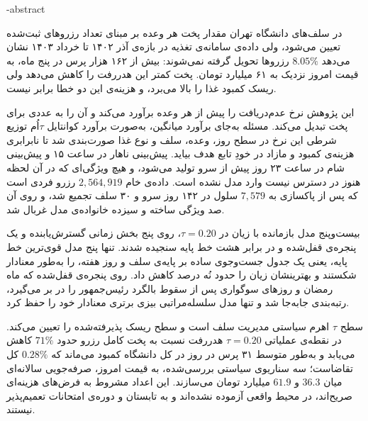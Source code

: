 \fa-abstract{
در سلف‌های دانشگاه تهران مقدار پخت هر وعده بر مبنای تعداد رزروهای ثبت‌شده تعیین می‌شود،
ولی داده‌ی سامانه‌ی تغذیه در بازه‌ی آذر ۱۴۰۲ تا خرداد ۱۴۰۳ نشان می‌دهد $8.05\%$ رزروها
تحویل گرفته نمی‌شوند: بیش از ۱۶۲ هزار پرس در پنج ماه، به قیمت امروز نزدیک به ۶۱ میلیارد
تومان. پخت
کمتر این هدررفت را کاهش می‌دهد ولی ریسک کمبود غذا را بالا می‌برد، و هزینه‌ی این دو خطا
برابر نیست.

این پژوهش نرخ عدم‌دریافت را پیش از هر وعده برآورد می‌کند و آن را به عددی برای پخت تبدیل
می‌کند. مسئله به‌جای برآورد میانگین، به‌صورت برآورد کوانتایل $\tau$اُم توزیع شرطی این نرخ
در سطح روز، وعده، سلف و نوع غذا صورت‌بندی شد تا نابرابری هزینه‌ی کمبود و مازاد در خودِ
تابع هدف بیاید. پیش‌بینی ناهار در ساعت ۱۵ و پیش‌بینی شام در ساعت ۲۳ روز پیش از سرو
تولید می‌شود، و هیچ ویژگی‌ای که در آن لحظه هنوز در دسترس نیست وارد مدل نشده است. داده‌ی
خام $2{,}564{,}919$ رزرو فردی است که پس از پاکسازی به $7{,}579$
سلول در ۱۴۲ روز سرو و ۳۰ سلف تجمیع شد، و روی آن صد ویژگی ساخته و سیزده خانواده‌ی مدل
غربال شد.

بیست‌وپنج مدل بازمانده با زیان  در $\tau = 0.20$، روی پنج بخش زمانی
گسترش‌یابنده و یک پنجره‌ی قفل‌شده و در برابر هشت خط پایه سنجیده شدند. تنها پنج مدل
قوی‌ترین خط پایه، یعنی یک جدول جست‌وجوی ساده بر پایه‌ی سلف و روز هفته، را به‌طور معنادار
شکستند و بهترینشان زیان را حدود نُه درصد کاهش داد. روی پنجره‌ی قفل‌شده که ماه رمضان و روزهای
سوگواری پس از سقوط بالگرد رئیس‌جمهور را در بر می‌گیرد، رتبه‌بندی جابه‌جا شد و تنها مدل
سلسله‌مراتبی بیزی برتری معنادار خود را حفظ کرد.

سطح $\tau$ اهرم سیاستی مدیریت سلف است و سطح ریسک پذیرفته‌شده را تعیین می‌کند. در نقطه‌ی عملیاتی $\tau = 0.20$ هدررفت نسبت به پخت
کامل رزرو حدود $71\%$ کاهش می‌یابد و به‌طور متوسط ۳۱ پرس در روز در کل دانشگاه کمبود
می‌ماند که $0.28\%$ کل تقاضاست؛ سه سناریوی سیاستی بررسی‌شده، به قیمت امروز، صرفه‌جویی
سالانه‌ای میان $36.3$ و $61.9$ میلیارد تومان می‌سازند. این اعداد مشروط به فرض‌های هزینه‌ای صریح‌اند، در
محیط واقعی آزموده نشده‌اند و به تابستان و دوره‌ی امتحانات تعمیم‌پذیر نیستند.
}

